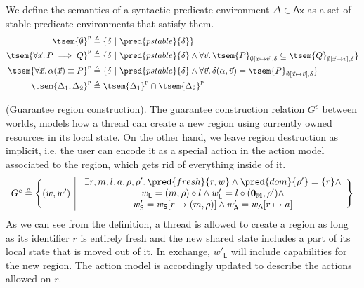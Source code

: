 We define the semantics of a syntactic predicate environment $\Delta \in \mathsf{Ax}$ as a set of stable predicate environments that satisfy them.
\begin{align*}
	\tsem{\emptyset}^\textsc{p} &\triangleq \{ \delta\ |\ \pred{pstable}{\delta} \} \\
	\tsem{\forall \vec{x} \ldotp P \implies Q}^\textsc{p} &\triangleq \{ \delta\ |\ \pred{pstable}{\delta} \land \forall \vec{v} \ldotp \tsem{P}_{\emptyset[\vec{x} \mapsto \vec{v}], \delta} \subseteq \tsem{Q}_{\emptyset[\vec{x} \mapsto \vec{v}], \delta} \} \\
	\tsem{\forall \vec{x} \ldotp \alpha(\vec{x}) \equiv P}^\textsc{p} &\triangleq \{ \delta\ |\ \pred{pstable}{\delta} \land \forall \vec{v} \ldotp \delta(\alpha, \vec{v}) = \tsem{P}_{\emptyset[\vec{x} \mapsto \vec{v}], \delta} \} \\
	\tsem{\Delta_1, \Delta_2}^\textsc{p} &\triangleq \tsem{\Delta_1}^\textsc{p} \cap \tsem{\Delta_2}^\textsc{p}
\end{align*}

 (Guarantee region construction). The guarantee construction relation $G^c$ between worlds, models how a thread can create a new region using currently owned resources in its local state. On the other hand, we leave region destruction as implicit, i.e. the user can encode it as a special action in the action model associated to the region, which gets rid of everything inside of it.
\[
\begin{array}{r | l}
	G^c \triangleq \Bigg\{ (w, w')
	&
	\begin{array}{c}
		\exists r, m, l, a, \rho, \rho' \ldotp \pred{fresh}{r, w} \land \pred{dom}{\rho'} = \{r\} \land
		\\
		w_\mathsf{L} = (m, \rho) \circ l \land w'_\mathsf{L} = l \circ (\mathbf{0}_\mathbb{M}, \rho') \land
		\\
		w'_\mathsf{S} = w_\mathsf{S}[r \mapsto (m, \rho) ] \land w'_\mathsf{A} = w_\mathsf{A}[r \mapsto a]
	\end{array}
	\Bigg\}
\end{array}
\]
As we can see from the definition, a thread is allowed to create a region as long as its identifier $r$ is entirely fresh and the new shared state includes a part of its local state that is moved out of it. In exchange, $w'_\mathsf{L}$ will include capabilities for the new region. The action model is accordingly updated to describe the actions allowed on $r$.

